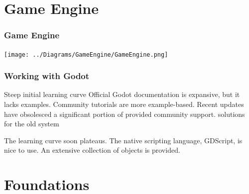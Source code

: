 \documentclass[aspectratio=169]{beamer}
\begin{document}

\section{Game Engine}


\begin{frame}

  \frametitle{Game Engine}

  \begin{center}
    \texttt{[image: ../Diagrams/GameEngine/GameEngine.png]}
  \end{center}

\end{frame}



\begin{frame}

  \frametitle{Working with Godot}

  \begin{outline}
    \1 Steep initial learning curve
    \1 Official Godot documentation is expansive, but it lacks examples.
    \1 Community tutorials are more example-based.
    \1 Recent updates have obsolesced a significant portion of provided
    community support.
      \2 solutions for the old system
  \end{outline}

  \vspace*{1cm}

  \begin{outline}
    \1 The learning curve soon plateaus.
    \1 The native scripting language, GDScript, is nice to use.
    \1 An extensive collection of objects is provided.
  \end{outline}

\end{frame}


\section{Foundations}

\end{document}
